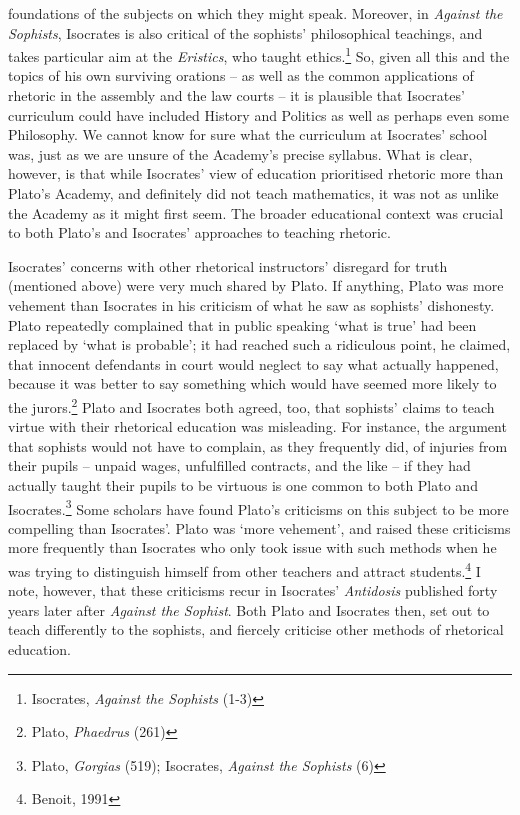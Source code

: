 \begin{multicols}{2}
foundations of the subjects on which they might speak. Moreover, in
\emph{Against the Sophists}, Isocrates is also critical of the sophists'
philosophical teachings, and takes particular aim at the
\emph{Eristics}, who taught ethics.\footnote{\textsuperscript{}
	Isocrates, \emph{Against the Sophists }(1-3)} So, given all this and
the topics of his own surviving orations -- as well as the common
applications of rhetoric in the assembly and the law courts -- it is
plausible that Isocrates' curriculum could have included History and
Politics as well as perhaps even some Philosophy. We cannot know for
sure what the curriculum at Isocrates' school was, just as we are unsure
of the Academy's precise syllabus. What is clear, however, is that while
Isocrates' view of education prioritised rhetoric more than Plato's
Academy, and definitely did not teach mathematics, it was not as unlike
the Academy as it might first seem. The broader educational context was
crucial to both Plato's and Isocrates' approaches to teaching rhetoric.

Isocrates' concerns with other rhetorical instructors' disregard for
truth (mentioned above) were very much shared by Plato. If anything,
Plato was more vehement than Isocrates in his criticism of what he saw
as sophists' dishonesty. Plato repeatedly complained that in public
speaking `what is true' had been replaced by `what is probable'; it had
reached such a ridiculous point, he claimed, that innocent defendants in
court would neglect to say what actually happened, because it was better
to say something which would have seemed more likely to the
jurors.\footnote{\textsuperscript{} Plato, \emph{Phaedrus} (261)} Plato
and Isocrates both agreed, too, that sophists' claims to teach virtue
with their rhetorical education was misleading. For instance, the
argument that sophists would not have to complain, as they frequently
did, of injuries from their pupils -- unpaid wages, unfulfilled
contracts, and the like -- if they had actually taught their pupils to
be virtuous is one common to both Plato and Isocrates.\footnote{\textsuperscript{}
	Plato, \emph{Gorgias} (519); Isocrates, \emph{Against the Sophists}
	(6) } Some scholars have found Plato's criticisms on this subject to
be more compelling than Isocrates'. Plato was `more vehement', and
raised these criticisms more frequently than Isocrates who only took
issue with such methods when he was trying to distinguish himself from
other teachers and attract students.\footnote{\textsuperscript{} Benoit,
	1991} I note, however, that these criticisms recur in Isocrates'
\emph{Antidosis} published forty years later after \emph{Against the
	Sophist}. Both Plato and Isocrates then, set out to teach differently to
the sophists, and fiercely criticise other methods of rhetorical
education.


\end{multicols}

